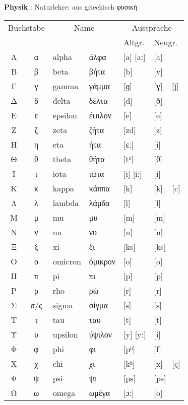 \documentclass[a4paper]{article}
\begin{document}
\textbf{Physik} : Naturlehre: aus griechisch φυσική


\begin{tabular}[h]{ccllll}
  \hline
  \multicolumn{2}{c}{Buchstabe}&\multicolumn{2}{c}{Name}&\multicolumn{2}{c}{Aussprache}\\
  \multicolumn{2}{c}{}&\multicolumn{2}{c}{}&Altgr.&Neugr.\\
  \hline
  Α & α   &  alpha   &  άλφα    &  [a] [aː] &  [a]       \\
  Β & β   &  beta    &  βήτα    &  [b]      &  [v]       \\
  Γ & γ   &  gamma   &  γάμμα   &  [ɡ]      &  [ɣ] ~ [ʝ] \\
  Δ & δ   &  delta   &  δέλτα   &  [d]      &  [ð]       \\
  Ε & ε   &  epsilon &  έψιλον  &  [e]      &  [e]       \\
  Ζ & ζ   &  zeta    &  ζήτα    &  [zd]     &  [z]       \\
  Η & η   &  eta     &  ήτα     &  [ɛː]     &  [i]       \\
  Θ & θ   &  theta   &  θήτα    &  [tʰ]     &  [θ]       \\
  Ι & ι   &  iota    &  ιώτα    &  [i] [iː] &  [i]       \\
  Κ & κ   &  kappa   &  κάππα   &  [k]      &  [k] ~ [c] \\
  Λ & λ   &  lambda  &  λάμδα   &  [l]      &  [l]       \\
  Μ & μ   &  mu      &  μυ      &  [m]      &  [m]       \\
  Ν & ν   &  nu      &  νυ      &  [n]      &  [n]       \\
  Ξ & ξ   &  xi      &  ξι      &  [ks]     &  [ks]      \\
  Ο & ο   &  omicron &  όμικρον &  [o]      &  [o]       \\
  Π & π   &  pi      &  πι      &  [p]      &  [p]       \\
  Ρ & ρ   &  rho     &  ρώ      &  [r]      &  [r]       \\
  Σ & σ/ς &  sigma   &  σίγμα   &  [s]      &  [s]       \\
  Τ & τ   &  tau     &  ταυ     &  [t]      &  [t]       \\
  Υ & υ   &  upsilon &  ύψιλον  &  [y] [yː] &  [i]       \\
  Φ & φ   &  phi     &  φι      &  [pʰ]     &  [f]       \\
  Χ & χ   &  chi     &  χι      &  [kʰ]     &  [x] ~ [ç] \\
  Ψ & ψ   &  psi     &  ψι      &  [ps]     &  [ps]      \\
  Ω & ω   &  omega   &  ωμέγα   &  [ɔː]     &  [o]       \\
  \hline
\end{tabular}
\end{document}
